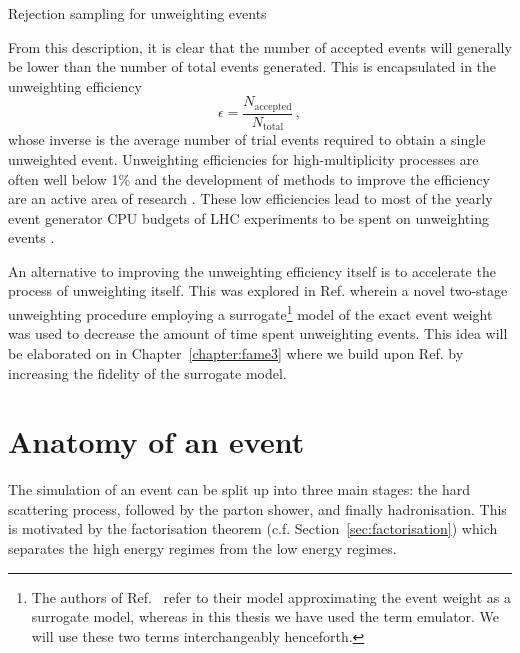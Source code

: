 \documentclass[main.tex]{subfiles}
\begin{document}
    \begin{algorithm}[ht]
        \caption{Rejection sampling for unweighting events}\label{alg:unweighting}
    \end{algorithm}

    From this description, it is clear that the number
    of accepted events will generally be lower than
    the number of total events generated. This is encapsulated
    in the unweighting efficiency
    \begin{equation}\label{eqn:unweighting_efficiency}
        \epsilon = \dfrac{N_{\mathrm{accepted}}}{N_{\mathrm{total}}} \, ,
    \end{equation}
    whose inverse is the average number of trial
    events required to obtain a single unweighted event.
    Unweighting efficiencies for high-multiplicity processes
    are often well below 1\% \cite{Hoche:2019flt,Gao:2020zvv} and the development
    of methods to improve the efficiency are an active area of research
    \cite{Jadach:1999sf,Jadach:2002kn}.
    These low efficiencies lead to most of the
    yearly event generator CPU budgets of LHC experiments to be spent on
    unweighting events \cite{HSFPhysicsEventGeneratorWG:2020gxw}.

    An alternative to improving the unweighting efficiency
    itself is to accelerate the process of unweighting itself. This
    was explored in Ref. \cite{Danziger:2021eeg} wherein a
    novel two-stage unweighting procedure employing a surrogate\footnote{The authors of Ref.~\cite{Danziger:2021eeg}
    refer to their model approximating the event weight as a surrogate model, whereas in
    this thesis we have used the term emulator. We will use these two terms interchangeably
    henceforth.}
    model of the exact event weight was used to decrease the amount of
    time spent unweighting events. This idea will be elaborated on
    in Chapter~\ref{chapter:fame3} where we build upon
    Ref. \cite{Danziger:2021eeg} by increasing the fidelity of
    the surrogate model.

    \section{Anatomy of an event}\label{sec:anatomy_event}
    The simulation of an event can be split up into three
    main stages: the hard scattering process, followed by
    the parton shower, and finally hadronisation.
    This is motivated by the factorisation theorem (c.f. Section~\ref{sec:factorisation})
    which separates the high energy regimes from the low
    energy regimes.
\end{document}
